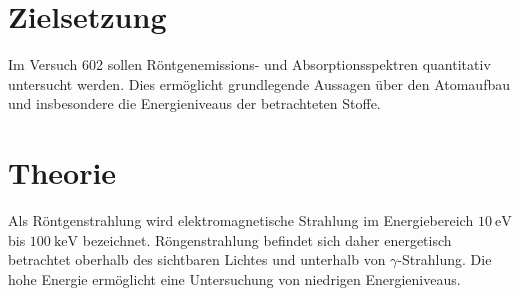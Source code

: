 \setcounter{page}{1}
\section*{Zielsetzung}
Im Versuch 602 sollen Röntgenemissions- und Absorptionsspektren quantitativ untersucht werden.
Dies ermöglicht grundlegende Aussagen über den Atomaufbau und insbesondere die Energieniveaus
der betrachteten Stoffe.
\section{Theorie}
Als Röntgenstrahlung wird elektromagnetische Strahlung im Energiebereich $\SI{10}{\eV}$
bis $\SI{100}{\kilo\eV}$ bezeichnet. Röngenstrahlung befindet sich daher energetisch betrachtet oberhalb des sichtbaren Lichtes und
unterhalb von $\gamma$-Strahlung. Die hohe Energie ermöglicht eine Untersuchung von niedrigen Energieniveaus.
